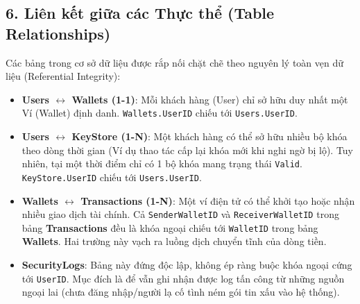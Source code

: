 \documentclass[11pt,a4paper]{article}
\begin{document}
\subsection{6. Liên kết giữa các Thực thể (Table Relationships)}
Các bảng trong cơ sở dữ liệu được rắp nối chặt chẽ theo nguyên lý toàn vẹn dữ liệu (Referential Integrity):
\begin{itemize}
    \item \textbf{Users $\leftrightarrow$ Wallets (1-1)}: Mỗi khách hàng (User) chỉ sở hữu duy nhất một Ví (Wallet) định danh. \texttt{Wallets.UserID} chiếu tới \texttt{Users.UserID}.
    \item \textbf{Users $\leftrightarrow$ KeyStore (1-N)}: Một khách hàng có thể sở hữu nhiều bộ khóa theo dòng thời gian (Ví dụ thao tác cấp lại khóa mới khi nghi ngờ bị lộ). Tuy nhiên, tại một thời điểm chỉ có 1 bộ khóa mang trạng thái \texttt{Valid}. \texttt{KeyStore.UserID} chiếu tới \texttt{Users.UserID}.
    \item \textbf{Wallets $\leftrightarrow$ Transactions (1-N)}: Một ví điện tử có thể khởi tạo hoặc nhận nhiều giao dịch tài chính. Cả \texttt{SenderWalletID} và \texttt{ReceiverWalletID} trong bảng \textbf{Transactions} đều là khóa ngoại chiếu tới \texttt{WalletID} trong bảng \textbf{Wallets}. Hai trường này vạch ra luồng dịch chuyển tĩnh của dòng tiền.
    \item \textbf{SecurityLogs}: Bảng này đứng độc lập, không ép ràng buộc khóa ngoại cứng tới \texttt{UserID}. Mục đích là để vẫn ghi nhận được log tấn công từ những nguồn ngoại lai (chưa đăng nhập/người lạ cố tình ném gói tin xấu vào hệ thống).
\end{itemize}

\vspace{0.5cm}
\end{document}

